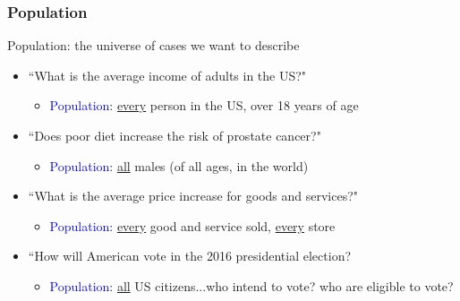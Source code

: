 \documentclass{beamer}
\newcommand{\blue}{\textcolor{blue}}
\begin{document}
\begin{frame}
 \frametitle<+->{Population}
 Population: the \alert{universe of cases} we want to describe
 \begin{itemize}[<+->]
   \item ``What is the average income of adults in the US?"
      \begin{itemize}
        \item \blue{Population}: \underline{every} person in the US, over 18 years of age
      \end{itemize}
   \item ``Does poor diet increase the risk of prostate cancer?"
      \begin{itemize}
        \item \blue{Population}: \underline{all} males (of all ages, in the world)
      \end{itemize}
   \item ``What is the average price increase for goods and services?"
      \begin{itemize}
        \item \blue{Population}: \underline{every} good and service sold, \underline{every} store
      \end{itemize}
   \item ``How will American vote in the 2016 presidential election?
      \begin{itemize}
        \item \blue{Population}: \underline{all} US citizens...who intend to vote? who are eligible to vote?
      \end{itemize}
 \end{itemize}
\end{frame}
\end{document}

